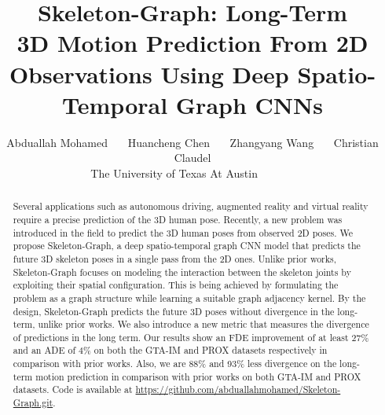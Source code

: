 \documentclass[10pt,twocolumn,letterpaper]{article}
\begin{document}
\title{Skeleton-Graph: Long-Term \\ 3D Motion Prediction From 2D Observations Using Deep Spatio-Temporal Graph CNNs}

\author{
	Abduallah Mohamed \ \ \ 
	Huancheng Chen \ \ \ 
	Zhangyang Wang \ \ \ 
	Christian Claudel\\
	\small The University of Texas At Austin \ \ \ \ \ \
}









\maketitle
\ificcvfinal\thispagestyle{empty}\fi

\begin{abstract}
Several applications such as autonomous driving, augmented reality and virtual reality require a precise prediction of the 3D human pose. Recently, a new problem was introduced in the field to predict the 3D human poses from observed 2D poses. We propose Skeleton-Graph, a deep spatio-temporal graph CNN model that predicts the future 3D skeleton poses in a single pass from the 2D ones. Unlike prior works, Skeleton-Graph focuses on modeling the interaction between the skeleton joints by exploiting their spatial configuration. This is being achieved by formulating the problem as a graph structure while learning a suitable graph adjacency kernel. By the design, Skeleton-Graph predicts the future 3D poses without divergence in the long-term, unlike prior works. We also introduce a new metric that measures the divergence of predictions in the long term. Our results show an FDE improvement of at least 27\% and an ADE of 4\% on both the GTA-IM and PROX datasets respectively in comparison with prior works. Also, we are 88\% and 93\% less divergence on the long-term motion prediction in comparison with prior works on both GTA-IM and PROX datasets. Code is available at \url{https://github.com/abduallahmohamed/Skeleton-Graph.git}.
\end{abstract}
\end{document}
